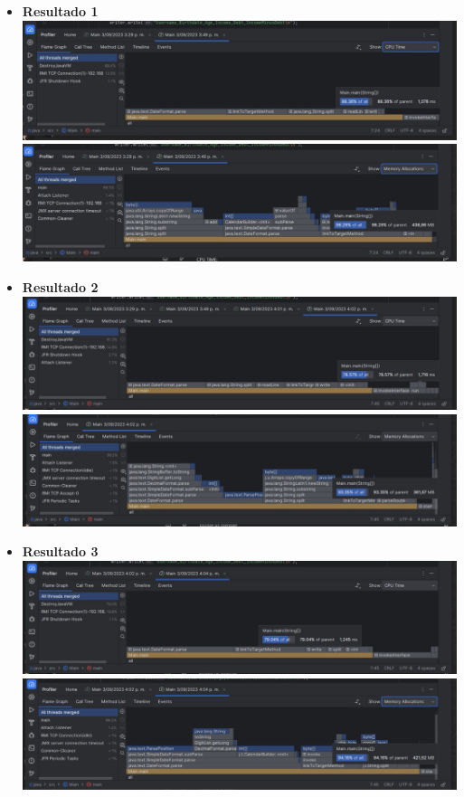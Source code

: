 \documentclass[a4paper,twocolumn,10pt]{article}
\begin{document}
\begin{itemize}

\item \textbf{Resultado 1}
\includegraphics[width=0.85\linewidth]{HP AMD E1-1200 APU/temporaljava.jpg}
\includegraphics[width=0.85\linewidth]{HP AMD E1-1200 APU/espacialjava.jpg}


\item \textbf{Resultado 2}
\includegraphics[width=0.85\linewidth]{HP AMD E1-1200 APU/resultado.2.jpg}
\includegraphics[width=0.85\linewidth]{HP AMD E1-1200 APU/resultado2.jpg}


\item \textbf{Resultado 3}
\includegraphics[width=0.85\linewidth]{HP AMD E1-1200 APU/resultado.3.jpg}
\includegraphics[width=0.85\linewidth]{HP AMD E1-1200 APU/r3.jpg}



\end{itemize}
\end{document}
